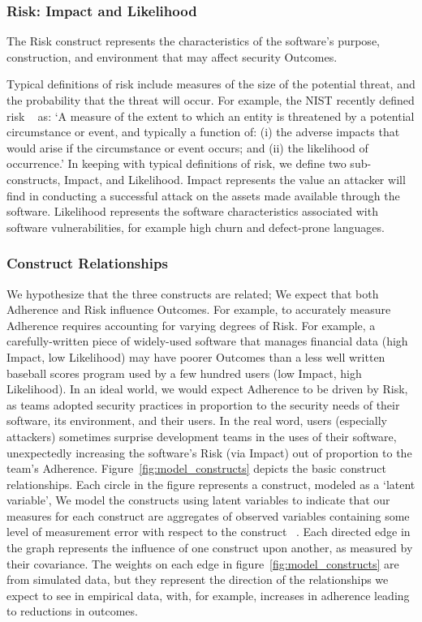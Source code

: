 \subsubsection{Risk: Impact and Likelihood}

The Risk construct represents the characteristics of the software's purpose, construction, and environment that may affect security Outcomes.

Typical definitions of risk include measures of the size of the potential threat, and the probability that the threat will occur. For example, the NIST recently defined risk ~\cite{nist2011managing} as: `A measure of the extent to which an entity is threatened by a potential circumstance or event, and typically a function of: (i) the adverse impacts that would arise if the circumstance or event occurs; and (ii) the likelihood of occurrence.' In keeping with typical definitions of risk, we define two sub-constructs, Impact, and Likelihood. Impact represents the value an attacker will find in conducting a successful attack on the assets made available through the software. Likelihood represents the software characteristics associated with software vulnerabilities, for example high churn and defect-prone languages. 


\subsubsection{Construct Relationships}
We hypothesize that the three constructs are related; We expect that both Adherence and Risk influence Outcomes. For example, to accurately measure Adherence requires accounting for varying degrees of Risk. For example, a carefully-written piece of widely-used software that manages financial data (high Impact, low Likelihood) may have poorer Outcomes than a less well written baseball scores program used by a few hundred users (low Impact, high Likelihood). In an ideal world, we would expect Adherence to be driven by Risk, as teams adopted security practices in proportion to the security needs of their software, its environment, and their users. In the real word, users (especially attackers) sometimes surprise development teams in the uses of their software, unexpectedly increasing the software's Risk (via Impact) out of proportion to the team's Adherence. Figure~\ref{fig:model_constructs} depicts the basic construct relationships. Each circle in the figure represents a construct, modeled as a `latent variable', We model the constructs using latent variables to indicate that our measures for each construct are aggregates of observed variables containing some level of measurement error with respect to the construct ~\cite{kline2015principles,borsboom2008latent}. Each directed edge in the graph represents the influence of one construct upon another, as measured by their covariance. The weights on each edge in figure~\ref{fig:model_constructs} are from simulated data, but they represent the direction of the relationships we expect to see in empirical data, with, for example, increases in adherence leading to reductions in outcomes. 

